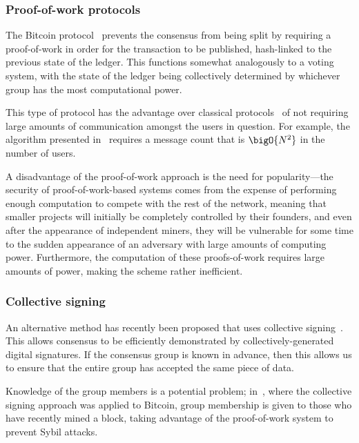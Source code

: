 \documentclass[USenglish]{llncs}
\begin{document}
\subsubsection{Proof-of-work protocols}

The Bitcoin protocol~\cite{bitcoin} prevents the consensus from being split
by requiring a proof-of-work in order for the transaction to be published,
hash-linked to the previous state of the ledger.  This functions somewhat
analogously to a voting system, with the state of the ledger being collectively
determined by whichever group has the most computational power.

This type of protocol has the advantage over classical protocols~\cite{cachin00}
of not requiring large amounts of communication amongst the users in question.
For example, the algorithm presented in~\cite{cachin00} requires
a message count that is $\bigO{N^2}$ in the number of users.



A disadvantage of the proof-of-work approach is the need for
popularity---the security of proof-of-work-based systems comes from the expense
of performing enough computation to compete with the rest of the network, meaning
that smaller projects will initially be completely controlled by their founders, and even
after the appearance of independent miners, they will be vulnerable for some time to the sudden
appearance of an adversary with large amounts of computing power.  Furthermore,
the computation of these proofs-of-work requires large amounts of power, making the
scheme rather inefficient.

\subsubsection{Collective signing}
An alternative method has recently been proposed
that uses collective signing~\cite{syta-cosi,kogias-bitcoin-collective-signing}.  This
allows consensus to be efficiently demonstrated by collectively-generated digital
signatures.  If the consensus group is known in advance, then this allows us to
ensure that the entire group has accepted the same piece of data.

Knowledge of the group members is a potential problem;
in~\cite{kogias-bitcoin-collective-signing}, where the collective signing approach was
applied to Bitcoin, group membership is given to those who have recently mined a block,
taking advantage of the proof-of-work system to prevent Sybil attacks.
\end{document}
